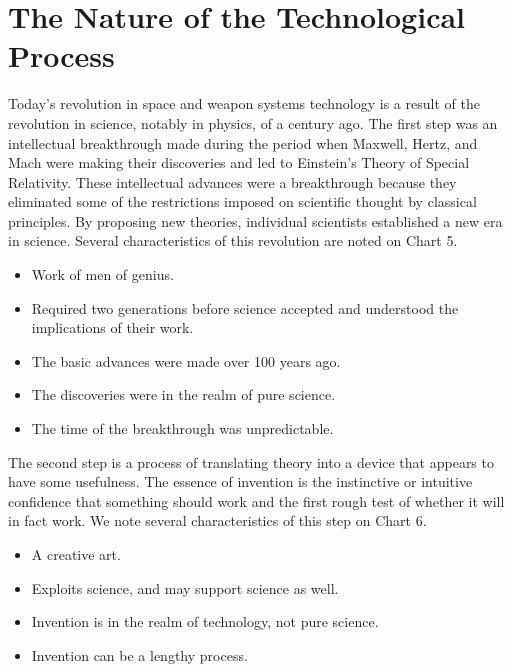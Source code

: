 \chapter{The Nature of the Technological Process}

Today's revolution in space and weapon systems technology is a result of the revolution in science, notably in physics, of a century ago. The first step was an intellectual breakthrough made during the period when Maxwell, Hertz, and Mach were making their discoveries and led to Einstein's Theory of Special Relativity. These intellectual advances were a breakthrough because they eliminated some of the restrictions imposed on scientific thought by classical principles. By proposing new theories, individual scientists established a new era in science. Several characteristics of this revolution are noted on Chart 5.

\medskip

\begin{mdframed}[nobreak=true, frametitle={CHART 5: The Intellectual Breakthrough}]
    \begin{itemize}
        \item Work of men of genius.
        \item Required two generations before science accepted and understood the implications of their work.
        \item The basic advances were made over 100 years ago.
        \item The discoveries were in the realm of pure science.
        \item The time of the breakthrough was unpredictable.
    \end{itemize}
\end{mdframed}

\medskip

The second step is a process of translating theory into a device that appears to have some usefulness. The essence of invention is the instinctive or intuitive confidence that something should work and the first rough test of whether it will in fact work. We note several characteristics of this step on Chart 6.

\begin{mdframed}[nobreak=true, frametitle={CHART 6: Characteristics of Invention}] 
    \begin{itemize}
        \item A creative art.
        \item Exploits science, and may support science as well.
        \item Invention is in the realm of technology, not pure science.
        \item Invention can be a lengthy process.
    \end{itemize}
\end{mdframed}

